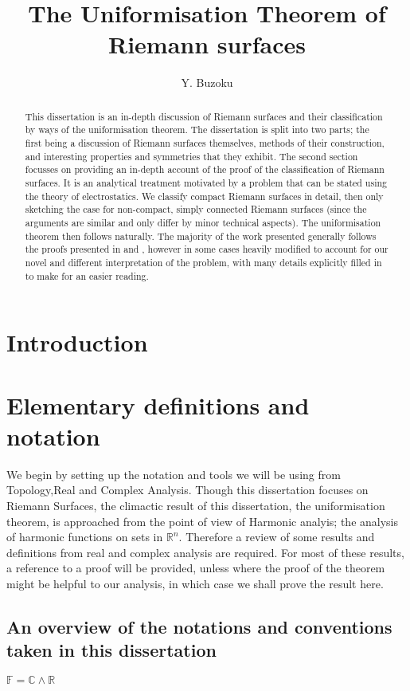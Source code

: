 \documentclass[11pt]{report}
\title{The Uniformisation Theorem of Riemann surfaces}
\author{Y. Buzoku}
\theoremstyle{definition}
\begin{document}
\maketitle
\tableofcontents

\newpage
\begin{abstract}
This dissertation is an in-depth discussion of Riemann surfaces and their classification by ways of the uniformisation theorem. The dissertation is split into two parts; the first being a discussion of Riemann surfaces themselves, methods of their construction, and interesting properties and symmetries that they exhibit. The second section focusses on providing an in-depth account of the proof of the classification of Riemann surfaces. It is an analytical treatment motivated by a problem that can be stated using the theory of electrostatics. We classify compact Riemann surfaces in detail, then only sketching the case for non-compact, simply connected Riemann surfaces (since the arguments are similar and only differ by minor technical aspects). The uniformisation theorem then follows naturally. The majority of the work presented generally follows the proofs presented in \cite{donaldson} and \cite{notes}, however in some cases heavily modified to account for our novel and different interpretation of the problem, with many details explicitly filled in to make for an easier reading. 
\end{abstract}
\declaration %
\chapter{Introduction}


\chapter{Elementary definitions and notation}
We begin by setting up the notation and tools we will be using from Topology,Real and Complex Analysis. Though this dissertation focuses on Riemann Surfaces,
the climactic result of this dissertation, the uniformisation theorem, is approached from the point of view of Harmonic analyis; the analysis of harmonic functions on sets in $\mathbb{R}^n$. Therefore a review of some results and definitions from real and complex analysis are required. For most of these results, a reference to a proof will be provided, unless where the proof of the theorem might be helpful to our analysis, in which case we shall prove the result here.
\section{An overview of the notations and conventions taken in this dissertation}
$\mathbb{F}=\mathbb{C} \wedge \mathbb{R}$
\end{document}
